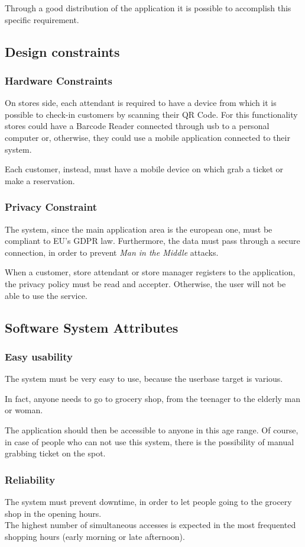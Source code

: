 \documentclass[table, 12pt]{article}
\begin{document}
Through a good distribution of the application it is possible to accomplish this specific requirement.

\subsection{Design constraints}
\subsubsection{Hardware Constraints}
On stores side, each attendant is required to have a device from which it is possible to check-in customers by scanning their QR Code.
For this functionality stores could have a Barcode Reader connected through usb to a personal computer or, otherwise, they could use a mobile application connected to their system.

Each customer, instead, must have a mobile device on which grab a ticket or make a reservation.

\subsubsection{Privacy Constraint}
The system, since the main application area is the european one, must be compliant to EU's GDPR law. Furthermore, the data must pass through a secure connection, in order to prevent \textit{Man in the Middle} attacks.

When a customer, store attendant or store manager registers to the application, the privacy policy must be read and accepter. Otherwise, the user will not be able to use the service.

\subsection{Software System Attributes}
\subsubsection{Easy usability}
The system must be very easy to use, because the userbase target is various.

In fact, anyone needs to go to grocery shop, from the teenager to the elderly man or woman.

The application should then be accessible to anyone in this age range. Of course, in case of people who can not use this system, there is the possibility of manual grabbing ticket on the spot.
\subsubsection{Reliability}
The system must prevent downtime, in order to let people going to the grocery shop in the opening hours. \\
The highest number of simultaneous accesses is expected in the most frequented shopping hours (early morning or late afternoon).
\end{document}
